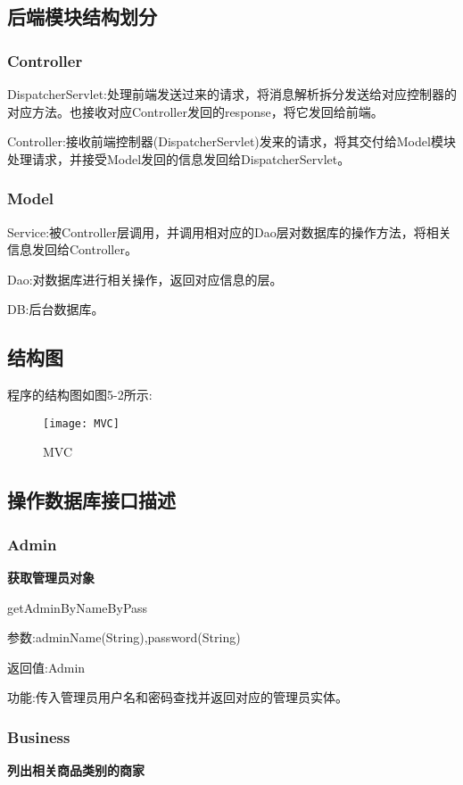 \subsection{后端模块结构划分}
\subsubsection{Controller}
DispatcherServlet:处理前端发送过来的请求，将消息解析拆分发送给对应控制器的对应方法。也接收对应Controller发回的response，将它发回给前端。

Controller:接收前端控制器(DispatcherServlet)发来的请求，将其交付给Model模块处理请求，并接受Model发回的信息发回给DispatcherServlet。

\subsubsection{Model}
Service:被Controller层调用，并调用相对应的Dao层对数据库的操作方法，将相关信息发回给Controller。

Dao:对数据库进行相关操作，返回对应信息的层。

DB:后台数据库。

\subsection{结构图}

程序的结构图如图5-2所示:

\begin{figure}[htbp]
    \centering
    \texttt{[image: MVC]}
    \caption{MVC}\label{fig:MVC}
    \vspace{\baselineskip}
\end{figure}

\subsection{操作数据库接口描述}

\subsubsection{Admin}
\textbf{获取管理员对象}

getAdminByNameByPass

参数:adminName(String),password(String)

返回值:Admin

功能:传入管理员用户名和密码查找并返回对应的管理员实体。

\subsubsection{Business}
\textbf{列出相关商品类别的商家}

